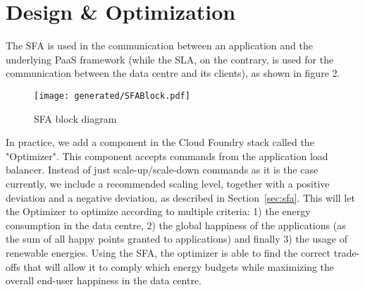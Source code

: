 \section{Design \& Optimization}
\label{sec:implem}

The SFA is used in the communication between an application and the underlying PaaS framework (while the SLA, on the contrary, is used for the communication between the data centre and its clients), as shown in figure 2.

\begin{figure}[h]
\label{fig:SFABlock}
\centering
\texttt{[image: generated/SFABlock.pdf]}
\caption{SFA block diagram}
\end{figure}

In practice, we add a component in the Cloud Foundry stack called the "Optimizer".
This component accepts commands from the application load balancer.
Instead of just scale-up/scale-down commands as it is the case currently, we include a recommended scaling level, together with a positive deviation and a negative deviation, as described in Section~\ref{sec:sfa}.
This will let the Optimizer to optimize according to multiple criteria: 1) the energy consumption in the data centre, 2) the global happiness of the applications (as the sum of all happy points granted to applications) and finally 3) the usage of renewable energies.
Using the SFA, the optimizer is able to find the correct trade-offs that will allow it to comply which energy budgets while maximizing the overall end-user happiness in the data centre.
